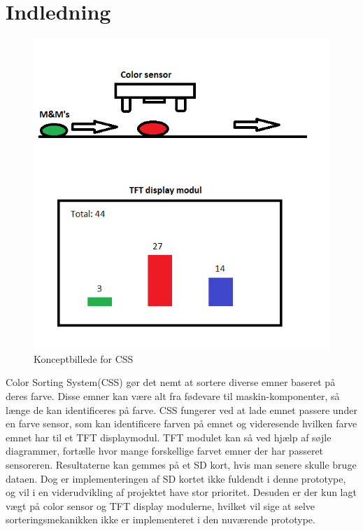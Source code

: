 \graphicspath{{Chapters/Indledning/}}

\section{Indledning}


\begin{figure}[H]
	\centering
	\includegraphics[width = 400pt]{Img/KonceptBillede}
	\caption{Konceptbillede for CSS}
	\label{fig:konceptbillede}
\end{figure}

Color Sorting System(CSS) gør det nemt at sortere diverse emner baseret på deres farve. Disse emner kan være alt fra fødevare til maskin-komponenter, så længe de kan identificeres på farve. CSS fungerer ved at lade emnet passere under en farve sensor, som kan identificere farven på emnet og videresende hvilken farve emnet har til et TFT displaymodul. TFT modulet kan så ved hjælp af søjle diagrammer, fortælle hvor mange forskellige farvet emner der har passeret sensoreren. Resultaterne kan gemmes på et SD kort, hvis man senere skulle bruge dataen. Dog er implementeringen af SD kortet ikke fuldendt i denne prototype, og vil i en viderudvikling af projektet have stor prioritet. Desuden er der kun lagt vægt på color sensor og TFT display modulerne, hvilket vil sige at selve sorteringsmekanikken ikke er implementeret i den nuværende prototype.


\newpage

